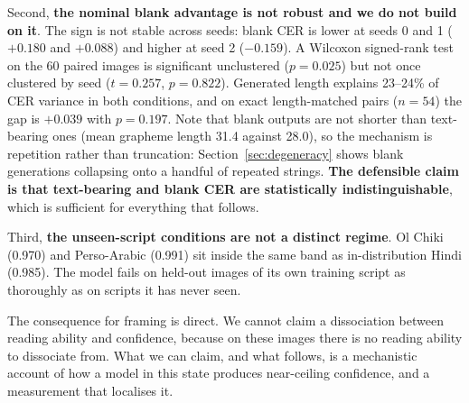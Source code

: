 \documentclass{article}
\begin{document}
Second, \textbf{the nominal blank advantage is not robust and we do not build on it}. The
sign is not stable across seeds: blank CER is lower at seeds 0 and 1 ($+0.180$ and $+0.088$)
and higher at seed 2 ($-0.159$). A Wilcoxon signed-rank test on the 60 paired images is
significant unclustered ($p = 0.025$) but not once clustered by seed
($t = 0.257$, $p = 0.822$). Generated length explains 23--24\% of CER variance in both
conditions, and on exact length-matched pairs ($n = 54$) the gap is $+0.039$ with
$p = 0.197$. Note that blank outputs are not shorter than text-bearing ones (mean grapheme length
31.4 against 28.0), so the mechanism is repetition rather than truncation:
Section~\ref{sec:degeneracy} shows blank generations collapsing onto a handful of repeated
strings. \textbf{The defensible claim is that text-bearing and blank CER are statistically
indistinguishable}, which is sufficient for everything that follows.

Third, \textbf{the unseen-script conditions are not a distinct regime}. Ol Chiki (0.970) and
Perso-Arabic (0.991) sit inside the same band as in-distribution Hindi (0.985). The model
fails on held-out images of its own training script as thoroughly as on scripts it has never seen.

The consequence for framing is direct. We cannot claim a dissociation between reading ability
and confidence, because on these images there is no reading ability to dissociate from. What we
can claim, and what follows, is a mechanistic account of how a model in this state produces
near-ceiling confidence, and a measurement that localises it.
\end{document}
